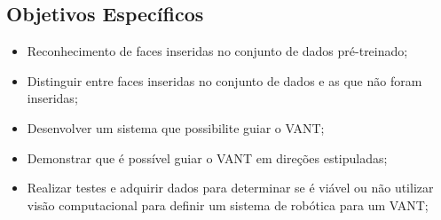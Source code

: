 


\subsection{Objetivos Específicos}
\begin{itemize}
    \item Reconhecimento de faces inseridas no conjunto de dados pré-treinado;
    \item Distinguir entre faces inseridas no conjunto de dados e as que não foram inseridas;
    \item Desenvolver um sistema que possibilite guiar o VANT;
    \item Demonstrar que é possível guiar o VANT em direções estipuladas;
    \item Realizar testes e adquirir dados para determinar se é viável ou não utilizar visão computacional para definir um sistema de robótica para um VANT;
\end{itemize}

